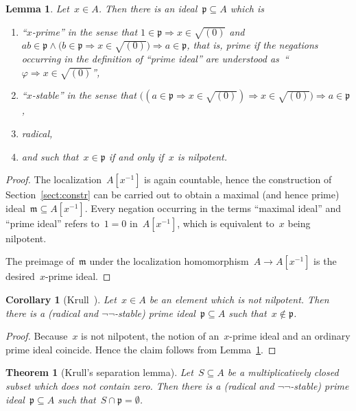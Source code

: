\documentclass[com,11pt,crcready]{iosart2x}
\theoremstyle{definition}
\theoremstyle{plain}
\newtheorem{corollary}[definition]{Corollary}
\newtheorem{lemma}[definition]{Lemma}
\newtheorem{theorem}[definition]{Theorem}
\theoremstyle{remark}
\newcommand{\?}{\,{:}\,}
\newcommand{\mmm}{\mathfrak{m}}
\newcommand{\ppp}{\mathfrak{p}}
\renewcommand{\_}{\mathpunct{.}\,}
\begin{document}
\begin{lemma}\label{lemma:x-prime}
Let~$x \in A$. Then there is an ideal~$\ppp \subseteq A$ which is
\begin{enumerate}
\item ``$x$-prime'' in the sense that
$1 \in \ppp \Rightarrow x \in \sqrt{(0)}$ and
$ab \in \ppp \wedge \bigl(b \in \ppp \Rightarrow x \in \sqrt{(0)}\bigr) \Longrightarrow
   a \in \ppp$,
that is, prime if the negations occurring in the definition of ``prime ideal''
are understood as~``$\varphi \Rightarrow x \in \sqrt{(0)}$'',
\item ``$x$-stable'' in the sense that
$\bigl((a \in \ppp \Rightarrow x \in \sqrt{(0)}) \Rightarrow x \in \sqrt{(0)}\bigr)
  \Rightarrow a \in \ppp$,
\item radical,
\item and such that~$x \in \ppp$ if and only if~$x$ is nilpotent.
\end{enumerate}
\end{lemma}

\begin{proof}The localization~$A[x^{-1}]$ is again countable, hence the
construction of Section~\ref{sect:constr} can be carried out to obtain a
maximal (and hence prime) ideal~$\mmm \subseteq A[x^{-1}]$. Every negation
occurring in the terms ``maximal ideal'' and ``prime ideal'' refers to~$1 = 0$
in~$A[x^{-1}]$, which is equivalent to~$x$ being nilpotent.

The preimage of~$\mmm$ under the localization homomorphism~$A \to A[x^{-1}]$ is
the desired~$x$-prime ideal.
\end{proof}

\begin{corollary}[Krull~\cite{krull:ohne}]\label{cor:nilp-prime}Let~$x \in A$ be an element which is not nilpotent. Then there is a
(radical and $\neg\neg$-stable) prime ideal~$\ppp \subseteq A$ such that~$x \not\in \ppp$.
\end{corollary}

\begin{proof}Because~$x$ is not nilpotent, the notion of an~$x$-prime ideal and
an ordinary prime ideal coincide. Hence the claim follows from
Lemma~\ref{lemma:x-prime}.\end{proof}

\begin{theorem}[Krull's separation lemma]Let~$S \subseteq A$ be a multiplicatively closed subset which
does not contain zero. Then there is a
(radical and $\neg\neg$-stable) prime ideal~$\ppp \subseteq A$ such that~$S
\cap \ppp = \emptyset$.
\end{theorem}
\end{document}
